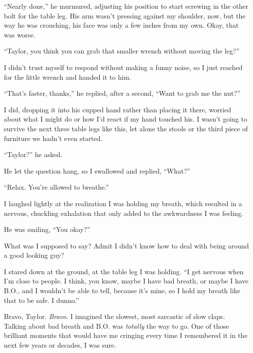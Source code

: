 ``Nearly done,'' he murmured, adjusting his position to start screwing in the other bolt for the table leg.  His arm wasn't pressing against my shoulder, now, but the way he was crouching, his face was only a few inches from my own.  Okay, that was worse.



``Taylor, you think you can grab that smaller wrench without moving the leg?''



I didn't trust myself to respond without making a funny noise, so I just reached for the little wrench and handed it to him.



``That's faster, thanks,'' he replied, after a second, ``Want to grab me the nut?''



I did, dropping it into his cupped hand rather than placing it there, worried about what I might do or how I'd react if my hand touched his.  I wasn't going to survive the next three table legs like this, let alone the stools or the third piece of furniture we hadn't even started.



``Taylor?'' he asked.



He let the question hang, so I swallowed and replied, ``What?''



``Relax.  You're allowed to breathe.''



I laughed lightly at the realization I was holding my breath, which resulted in a nervous, chuckling exhalation that only added to the awkwardness I was feeling.



He was smiling, ``You okay?''



What was I supposed to say?  Admit I didn't know how to deal with being around a good looking guy?



I stared down at the ground, at the table leg I was holding.  ``I get nervous when I'm close to people.  I think, you know, maybe I have bad breath, or maybe I have B.O., and I wouldn't be able to tell, because it's mine, so I hold my breath like that to be safe.  I dunno.''



Bravo, Taylor.  \emph{Bravo}.  I imagined the slowest, most sarcastic of slow claps.  Talking about bad breath and B.O. was \emph{totally} the way to go.  One of those brilliant moments that would have me cringing every time I remembered it in the next few years or decades, I was sure.



